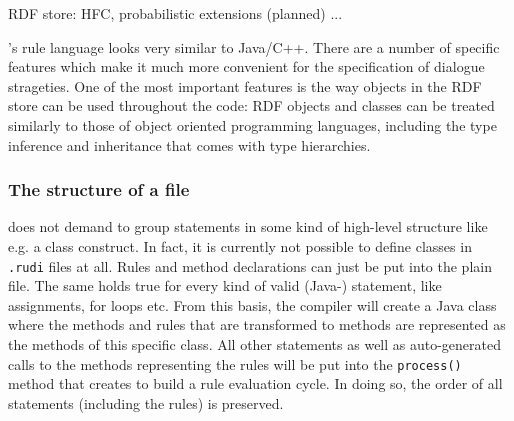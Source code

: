 RDF store: HFC, probabilistic extensions (planned) ...
\fi

\vonda's rule language looks very similar to Java/C++. There are a number of
specific features which make it much more convenient for the specification of
dialogue strageties. One of the most important features is the way objects in
the RDF store can be used throughout the code: RDF objects and classes can be
treated similarly to those of object oriented programming languages, including
the type inference and inheritance that comes with type hierarchies.



\subsubsection{The structure of a \vonda file}

%
\vonda does not demand to group statements in some kind of high-level structure
like e.g. a class construct. In fact, it is currently not possible to define
classes in \texttt{.rudi} files at all. Rules and method declarations can just
be put into the plain file. The same holds true for every kind of valid (Java-)
statement, like assignments, for loops etc. From this basis, the compiler will
create a Java class where the methods and rules that are transformed to methods
are represented as the methods of this specific class. All other statements as well as auto-generated calls to the methods representing the rules
will be put into the \texttt{process()} method that \vonda creates to build a
rule evaluation cycle. In doing so, the order of all statements (including the
rules) is preserved.

